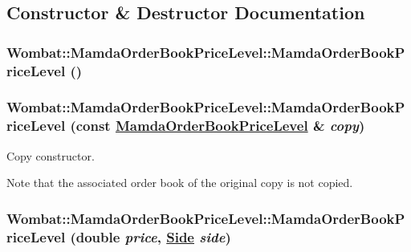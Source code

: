 \subsection{Constructor \& Destructor Documentation}
\hypertarget{classWombat_1_1MamdaOrderBookPriceLevel_f2a76dd1f145318e9bbbd0878dda16dd}{
\subsubsection[MamdaOrderBookPriceLevel]{\setlength{\rightskip}{0pt plus 5cm}Wombat::Mamda\-Order\-Book\-Price\-Level::Mamda\-Order\-Book\-Price\-Level ()}}
\label{classWombat_1_1MamdaOrderBookPriceLevel_f2a76dd1f145318e9bbbd0878dda16dd}


\hypertarget{classWombat_1_1MamdaOrderBookPriceLevel_fead97f8761ee45baa73f930bb4e8b28}{
\subsubsection[MamdaOrderBookPriceLevel]{\setlength{\rightskip}{0pt plus 5cm}Wombat::Mamda\-Order\-Book\-Price\-Level::Mamda\-Order\-Book\-Price\-Level (const \hyperlink{classWombat_1_1MamdaOrderBookPriceLevel}{Mamda\-Order\-Book\-Price\-Level} \& {\em copy})}}
\label{classWombat_1_1MamdaOrderBookPriceLevel_fead97f8761ee45baa73f930bb4e8b28}


Copy constructor. 

Note that the associated order book of the original copy is not copied. \hypertarget{classWombat_1_1MamdaOrderBookPriceLevel_b17b4def9722974d649c188305715970}{
\subsubsection[MamdaOrderBookPriceLevel]{\setlength{\rightskip}{0pt plus 5cm}Wombat::Mamda\-Order\-Book\-Price\-Level::Mamda\-Order\-Book\-Price\-Level (double {\em price}, \hyperlink{classWombat_1_1MamdaOrderBookPriceLevel_384c34b0a74d874b8969dee9b0d3718d}{Side} {\em side})}}
\label{classWombat_1_1MamdaOrderBookPriceLevel_b17b4def9722974d649c188305715970}


